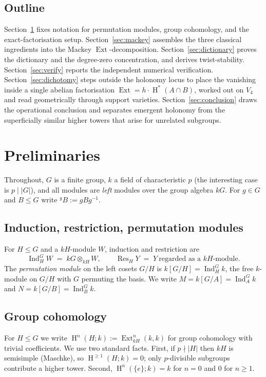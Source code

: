 \documentclass[11pt]{amsart}
\theoremstyle{plain}
\theoremstyle{definition}
\DeclareMathOperator{\Ind}{Ind}
\DeclareMathOperator{\Res}{Res}
\DeclareMathOperator{\Ext}{Ext}
\DeclareMathOperator{\Hh}{H}
\newcommand{\conj}[2]{{}^{#1}\!#2}
\begin{document}
\subsection*{Outline}
Section~\ref{sec:prelim} fixes notation for permutation modules, group cohomology, and the
exact-factorisation setup. Section~\ref{sec:mackey} assembles the three classical
ingredients into the Mackey $\Ext$-decomposition. Section~\ref{sec:dictionary} proves the
dictionary and the degree-zero concentration, and derives twist-stability.
Section~\ref{sec:verify} reports the independent numerical verification.
Section~\ref{sec:dichotomy} steps outside the holonomy locus to place the vanishing
inside a single abelian factorisation $\Ext=h\cdot\Hh^*(A\cap B)$, worked out on $V_4$
and read geometrically through support varieties.
Section~\ref{sec:conclusion} draws the operational conclusion and separates emergent
holonomy from the superficially similar higher towers that arise for unrelated subgroups.

\section{Preliminaries}\label{sec:prelim}

Throughout, $G$ is a finite group, $k$ a field of characteristic $p$ (the interesting case
is $p\mid\lvert G\rvert$), and all modules are \emph{left} modules over the group algebra
$kG$. For $g\in G$ and $B\le G$ write $\conj{g}{B}:=gBg^{-1}$.

\subsection{Induction, restriction, permutation modules}
For $H\le G$ and a $kH$-module $W$, induction and restriction are
\[
   \Ind_H^G W \;=\; kG\otimes_{kH} W,
   \qquad
   \Res_H Y \;=\; Y\ \text{regarded as a $kH$-module.}
\]
The \emph{permutation module} on the left cosets $G/H$ is
$k[G/H]=\Ind_H^G k$, the free $k$-module on $G/H$ with $G$ permuting the basis. We write
$M=k[G/A]=\Ind_A^G k$ and $N=k[G/B]=\Ind_B^G k$.

\subsection{Group cohomology}
For $H\le G$ we write $\Hh^n(H;k):=\Ext^n_{kH}(k,k)$ for group cohomology with trivial
coefficients. We use two standard facts. First, if $p\nmid\lvert H\rvert$ then $kH$ is
semisimple (Maschke), so $\Hh^{\ge 1}(H;k)=0$; only $p$-divisible subgroups contribute a
higher tower. Second, $\Hh^n(\{e\};k)=k$ for $n=0$ and $0$ for $n\ge 1$.
\end{document}
